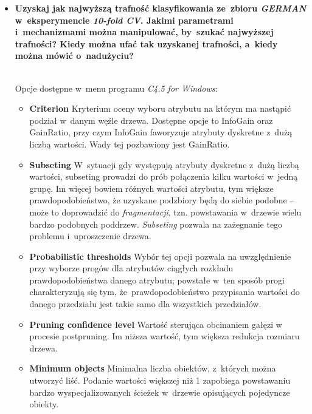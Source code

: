 \begin{itemize}
\item \textbf{Uzyskaj jak najwyższą trafność klasyfikowania ze~zbioru \emph{GERMAN} w~eksperymencie \emph{10-fold CV}. Jakimi parametrami i~mechanizmami można manipulować, by~szukać najwyższej trafności? Kiedy można ufać tak uzyskanej trafności, a~kiedy można mówić o~nadużyciu?}

\\Opcje dostępne w~menu programu \emph{C4.5 for Windows}:
\begin{itemize}
\item \textbf{Criterion} 
Kryterium oceny wyboru atrybutu na którym ma nastąpić podział w~danym węźle drzewa. Dostępne opcje to InfoGain oraz GainRatio, przy czym InfoGain faworyzuje atrybuty dyskretne z~dużą liczbą wartości. Wady tej pozbawiony jest GainRatio.

\item \textbf{Subseting} 
W~sytuacji gdy występują atrybuty dyskretne z~dużą liczbą wartości, subseting prowadzi do prób połączenia kilku wartości w~jedną grupę. Im więcej bowiem różnych wartości atrybutu, tym większe prawdopodobieństwo, że uzyskane podzbiory będą do siebie podobne -- może to doprowadzić do \emph{fragmentacji}, tzn. powstawania w~drzewie wielu bardzo podobnych poddrzew. \emph{Subseting} pozwala na zażegnanie tego problemu i~uproszczenie drzewa.

\item \textbf{Probabilistic thresholds}
Wybór tej opcji pozwala na uwzględnienie przy wyborze progów dla atrybutów ciągłych rozkładu prawdopodobieństwa danego atrybutu; powstałe w~ten sposób progi charakteryzują się tym, że~prawdopodobieństwo przypisania wartości do danego przedziału jest takie samo dla wszystkich przedziałów.

\item \textbf{Pruning confidence level} 
Wartość sterująca obcinaniem gałęzi w procesie postpruning. Im niższa wartość, tym większa redukcja rozmiaru drzewa.

\item \textbf{Minimum objects}
Minimalna liczba obiektów, z~których można utworzyć liść. Podanie wartości większej niż 1 zapobiega powstawaniu bardzo wyspecjalizowanych ścieżek w~drzewie opisujących pojedyncze obiekty.
\end{itemize}



\end{itemize}